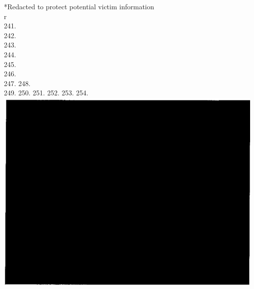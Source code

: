 \documentclass[10pt]{article}
\begin{document}
*Redacted to protect potential victim information\\
r\\
241.\\
242.\\
243.\\
244.\\
245.\\
246.\\
247. 248.\\
249. 250. 251. 252. 253. 254.\\
\includegraphics[max width=\textwidth, center]{2025_02_27_dd68c3d38de88f0516d9g-224}
\end{document}
